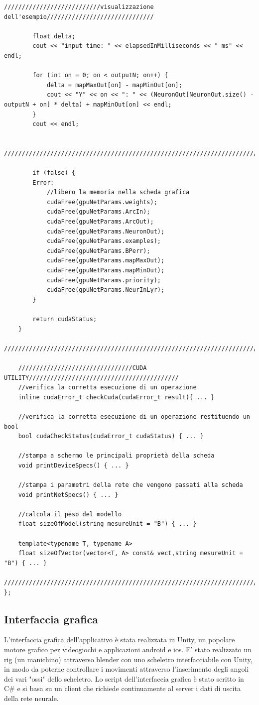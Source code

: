 \documentclass[10pt,a4paper]{article}
\begin{document}
\begin{lstlisting}[style=mycuda, caption= classe di interfaccia alla GPU, captionpos=b]
		///////////////////////////visualizzazione dell'esempio//////////////////////////////

		float delta;
		cout << "input time: " << elapsedInMilliseconds << " ms" << endl;

		for (int on = 0; on < outputN; on++) {
			delta = mapMaxOut[on] - mapMinOut[on];
			cout << "Y" << on << ": " << (NeuronOut[NeuronOut.size() - outputN + on] * delta) + mapMinOut[on] << endl;
		}
		cout << endl;
		
		//////////////////////////////////////////////////////////////////////////////////////

		if (false) {
		Error:
			//libero la memoria nella scheda grafica
			cudaFree(gpuNetParams.weights);
			cudaFree(gpuNetParams.ArcIn);
			cudaFree(gpuNetParams.ArcOut);
			cudaFree(gpuNetParams.NeuronOut);
			cudaFree(gpuNetParams.examples);
			cudaFree(gpuNetParams.BPerr);
			cudaFree(gpuNetParams.mapMaxOut);
			cudaFree(gpuNetParams.mapMinOut);
			cudaFree(gpuNetParams.priority);
			cudaFree(gpuNetParams.NeurInLyr);
		}

		return cudaStatus;
	}
	//////////////////////////////////////////////////////////////////////////////////////
	
	////////////////////////////////CUDA UTILITY//////////////////////////////////////////
	//verifica la corretta esecuzione di un operazione
	inline cudaError_t checkCuda(cudaError_t result){ ... }
	
	//verifica la corretta esecuzione di un operazione restituendo un bool
	bool cudaCheckStatus(cudaError_t cudaStatus) { ... }
	
	//stampa a schermo le principali proprietà della scheda
	void printDeviceSpecs() { ... }
	
	//stampa i parametri della rete che vengono passati alla scheda
	void printNetSpecs() { ... }
	
	//calcola il peso del modello
	float sizeOfModel(string mesureUnit = "B") { ... }
	
	template<typename T, typename A>
	float sizeOfVector(vector<T, A> const& vect,string mesureUnit = "B") { ... }
	//////////////////////////////////////////////////////////////////////////////////////
};

\end{lstlisting}

\subsection{Interfaccia grafica}
L'interfaccia grafica dell'applicativo è stata realizzata in Unity, un popolare motore grafico per videogiochi e applicazioni android e ios.
E' stato realizzato un rig (un manichino) attraverso blender con uno scheletro interfacciabile con Unity, in modo da poterne controllare i movimenti attraverso l'inserimento degli angoli dei vari "ossi" dello scheletro.
Lo script dell'interfaccia grafica è stato scritto in C\# e si basa su un client che richiede continuamente al server i dati di uscita della rete neurale.
\end{document}
